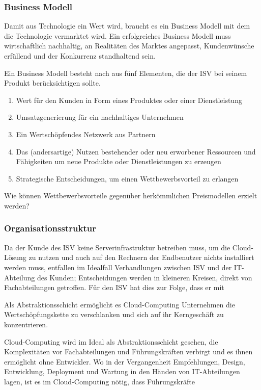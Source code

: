 \subsubsection{Business Modell}
Damit aus Technologie ein Wert wird, braucht es ein Business Modell mit dem die 
Technologie vermarktet wird. Ein erfolgreiches Business Modell muss 
wirtschaftlich nachhaltig, an Realitäten des Marktes angepasst, Kundenwünsche 
erfüllend und der Konkurrenz standhaltend sein. 

Ein Business Modell besteht nach 
 aus fünf 
Elementen, die der ISV bei seinem Produkt berücksichtigen sollte.
\begin{enumerate}
	\item Wert für den Kunden in Form eines Produktes oder einer 
Dienstleistung
	\item Umsatzgenerierung für ein nachhaltiges Unternehmen
	\item Ein Wertschöpfendes Netzwerk aus Partnern
	\item Das (andersartige) Nutzen bestehender oder neu 
erworbener Ressourcen und Fähigkeiten um neue Produkte oder Dienstleistungen zu 
erzeugen
	\item Strategische Entscheidungen, um einen Wettbewerbsvorteil zu 
erlangen
\end{enumerate}

Wie können Wettbewerbsvorteile gegenüber herkömmlichen Preismodellen erzielt 
werden?



\subsubsection{Organisationsstruktur}
Da der Kunde des ISV keine Serverinfrastruktur betreiben muss, um die 
Cloud-Lösung zu nutzen und auch auf den Rechnern der Endbenutzer nichts 
installiert werden muss, entfallen im Idealfall Verhandlungen zwischen ISV und 
der IT-Abteilung des Kunden; Entscheidungen werden in kleineren Kreisen, direkt 
von Fachabteilungen getroffen. Für den ISV hat dies zur Folge, dass er mit 

Als Abstraktionsschicht ermöglicht es Cloud-Computing Unternehmen die 
Wertschöpfungskette zu verschlanken und sich auf ihr Kerngeschäft zu 
konzentrieren.

Cloud-Computing wird im Ideal als Abstraktionsschicht gesehen, die Komplexitäten 
vor Fachabteilungen und Führungskräften verbirgt und es ihnen ermöglicht ohne 
Entwickler. Wo in der Vergangenheit Empfehlungen, Design, Entwicklung, 
Deployment und Wartung in den Händen von IT-Abteilungen lagen, ist es im 
Cloud-Computing nötig, dass Führungskräfte

